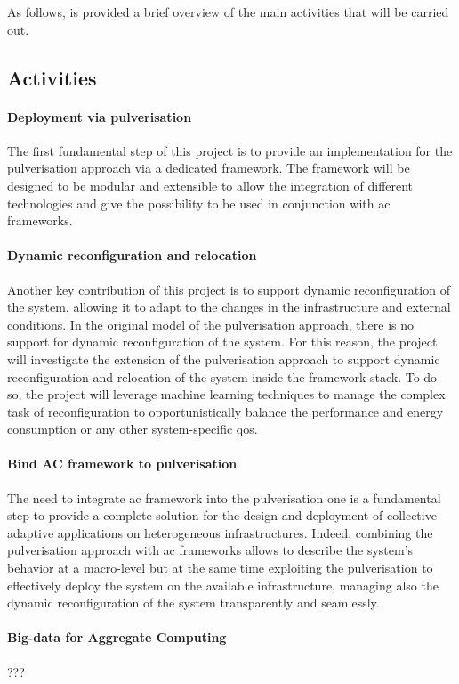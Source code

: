\documentclass[12pt]{article}
\newcommand{\meta}[1]{{\color{blue}#1}}
\begin{document}
As follows, is provided a brief overview of the main activities that will be carried out.

\subsection{Activities}\label{subsec:activities}

\meta{
\paragraph{Deployment via pulverisation}
The first fundamental step of this project is to provide an implementation for
the pulverisation approach via a dedicated framework.
%
The framework will be designed to be modular and extensible to allow the integration
of different technologies and give the possibility to be used in conjunction with
\ac{ac} frameworks.

\paragraph{Dynamic reconfiguration and relocation}
Another key contribution of this project is to support dynamic reconfiguration of the system,
allowing it to adapt to the changes in the infrastructure and external conditions.
%
In the original model of the pulverisation approach,
there is no support for dynamic reconfiguration of the system.
%
For this reason,
the project will investigate the extension of the pulverisation approach
to support dynamic reconfiguration and relocation of the system inside the framework stack.
%
To do so,
the project will leverage machine learning techniques to manage the complex task of reconfiguration
to opportunistically balance the performance and energy consumption or any other system-specific \ac{qos}.

\paragraph{Bind AC framework to pulverisation}
The need to integrate \ac{ac} framework into the pulverisation one is
a fundamental step to provide a complete solution for the design and deployment of
collective adaptive applications on heterogeneous infrastructures.
%
Indeed, combining the pulverisation approach with \ac{ac} frameworks
allows to describe the system's behavior at a macro-level
but at the same time exploiting the pulverisation to
effectively deploy the system on the available infrastructure,
managing also the dynamic reconfiguration of the system transparently and seamlessly.

\paragraph{Big-data for Aggregate Computing}
???
}
\end{document}
